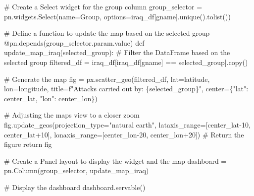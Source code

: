 \documentclass[
  letterpaper,
  DIV=11,
  numbers=noendperiod]{scrreprt}
\newenvironment{Shaded}{\begin{snugshade}}{\end{snugshade}}
\newcommand{\AttributeTok}[1]{\textcolor[rgb]{0.40,0.45,0.13}{#1}}
\newcommand{\CommentTok}[1]{\textcolor[rgb]{0.37,0.37,0.37}{#1}}
\newcommand{\ControlFlowTok}[1]{\textcolor[rgb]{0.00,0.23,0.31}{#1}}
\newcommand{\DecValTok}[1]{\textcolor[rgb]{0.68,0.00,0.00}{#1}}
\newcommand{\KeywordTok}[1]{\textcolor[rgb]{0.00,0.23,0.31}{#1}}
\newcommand{\NormalTok}[1]{\textcolor[rgb]{0.00,0.23,0.31}{#1}}
\newcommand{\OperatorTok}[1]{\textcolor[rgb]{0.37,0.37,0.37}{#1}}
\newcommand{\SpecialCharTok}[1]{\textcolor[rgb]{0.37,0.37,0.37}{#1}}
\newcommand{\SpecialStringTok}[1]{\textcolor[rgb]{0.13,0.47,0.30}{#1}}
\newcommand{\StringTok}[1]{\textcolor[rgb]{0.13,0.47,0.30}{#1}}
\begin{document}
\begin{Shaded}
\begin{Highlighting}[]
\CommentTok{\# Create a Select widget for the \textquotesingle{}group\textquotesingle{} column}
\NormalTok{group\_selector }\OperatorTok{=}\NormalTok{ pn.widgets.Select(name}\OperatorTok{=}\StringTok{\textquotesingle{}Group\textquotesingle{}}\NormalTok{, options}\OperatorTok{=}\NormalTok{iraq\_df[}\StringTok{\textquotesingle{}gname\textquotesingle{}}\NormalTok{].unique().tolist())}

\CommentTok{\# Define a function to update the map based on the selected group}
\AttributeTok{@pn.depends}\NormalTok{(group\_selector.param.value)}
\KeywordTok{def}\NormalTok{ update\_map\_iraq(selected\_group):}
    \CommentTok{\# Filter the DataFrame based on the selected group}
\NormalTok{    filtered\_df }\OperatorTok{=}\NormalTok{ iraq\_df[iraq\_df[}\StringTok{\textquotesingle{}gname\textquotesingle{}}\NormalTok{] }\OperatorTok{==}\NormalTok{ selected\_group].copy()}
    
    \CommentTok{\# Generate the map}
\NormalTok{    fig }\OperatorTok{=}\NormalTok{ px.scatter\_geo(filtered\_df, lat}\OperatorTok{=}\StringTok{\textquotesingle{}latitude\textquotesingle{}}\NormalTok{, lon}\OperatorTok{=}\StringTok{\textquotesingle{}longitude\textquotesingle{}}\NormalTok{, title}\OperatorTok{=}\SpecialStringTok{f"Attacks carried out by: }\SpecialCharTok{\{}\NormalTok{selected\_group}\SpecialCharTok{\}}\SpecialStringTok{"}\NormalTok{,}
\NormalTok{                        center}\OperatorTok{=}\NormalTok{\{}\StringTok{"lat"}\NormalTok{: center\_lat, }\StringTok{"lon"}\NormalTok{: center\_lon\})}

    \CommentTok{\# Adjusting the map\textquotesingle{}s view to a \textquotesingle{}closer\textquotesingle{} zoom}
\NormalTok{    fig.update\_geos(projection\_type}\OperatorTok{=}\StringTok{"natural earth"}\NormalTok{, lataxis\_range}\OperatorTok{=}\NormalTok{[center\_lat}\OperatorTok{{-}}\DecValTok{10}\NormalTok{, center\_lat}\OperatorTok{+}\DecValTok{10}\NormalTok{], lonaxis\_range}\OperatorTok{=}\NormalTok{[center\_lon}\OperatorTok{{-}}\DecValTok{20}\NormalTok{, center\_lon}\OperatorTok{+}\DecValTok{20}\NormalTok{])}
    \CommentTok{\# Return the figure}
    \ControlFlowTok{return}\NormalTok{ fig}

\CommentTok{\# Create a Panel layout to display the widget and the map}
\NormalTok{dashboard }\OperatorTok{=}\NormalTok{ pn.Column(group\_selector, update\_map\_iraq)}

\CommentTok{\# Display the dashboard}
\NormalTok{dashboard.servable()}
\end{Highlighting}
\end{Shaded}
\end{document}
